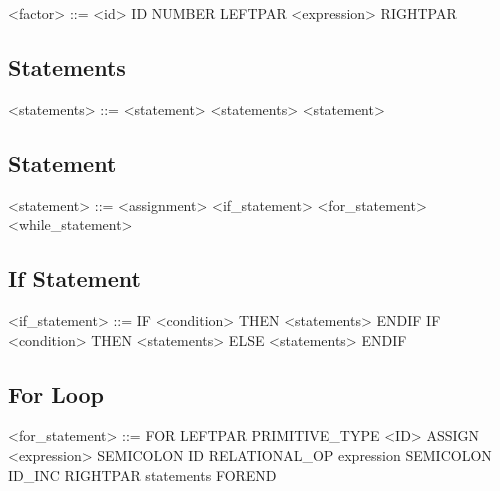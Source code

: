\documentclass{article}
\begin{document}
\begin{grammar}
<factor> ::= <id> ID
\alt NUMBER
\alt LEFTPAR <expression> RIGHTPAR

\end{grammar}

\subsection{Statements}

\begin{grammar}
<statements> ::= <statement> <statements>
\alt <statement>
\end{grammar}

\subsection{Statement}

\begin{grammar}
<statement> ::= <assignment>
\alt <if\_statement>
\alt <for\_statement>
\alt <while\_statement>

\end{grammar}

\subsection{If Statement}

\begin{grammar}
<if\_statement> ::= IF <condition> THEN <statements> ENDIF
\alt IF <condition> THEN <statements> ELSE <statements> ENDIF

\end{grammar}

\subsection{For Loop}

\begin{grammar}

<for\_statement> ::= FOR LEFTPAR PRIMITIVE\_TYPE <ID> ASSIGN <expression> SEMICOLON ID RELATIONAL_OP expression SEMICOLON ID_INC RIGHTPAR statements FOREND
\end{grammar}
\end{document}
